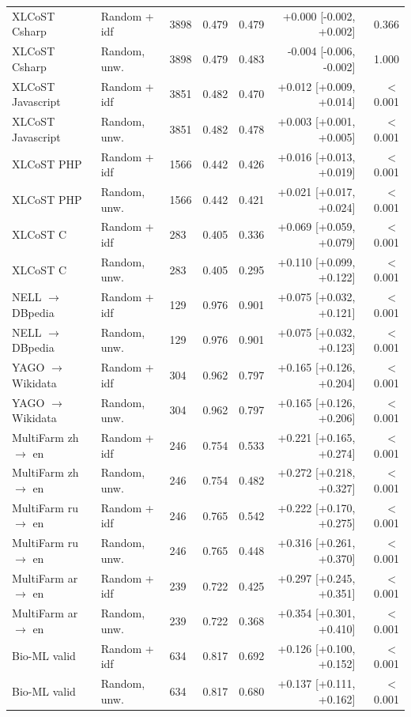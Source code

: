 \begin{longtable}{@{}lllrrrr@{}}
XLCoST Csharp & Random + idf & 3898 & 0.479 & 0.479 & +0.000 [-0.002, +0.002] & 0.366 \\
XLCoST Csharp & Random, unw. & 3898 & 0.479 & 0.483 & -0.004 [-0.006, -0.002] & 1.000 \\
XLCoST Javascript & Random + idf & 3851 & 0.482 & 0.470 & +0.012 [+0.009, +0.014] & $<$0.001 \\
XLCoST Javascript & Random, unw. & 3851 & 0.482 & 0.478 & +0.003 [+0.001, +0.005] & $<$0.001 \\
XLCoST PHP & Random + idf & 1566 & 0.442 & 0.426 & +0.016 [+0.013, +0.019] & $<$0.001 \\
XLCoST PHP & Random, unw. & 1566 & 0.442 & 0.421 & +0.021 [+0.017, +0.024] & $<$0.001 \\
XLCoST C & Random + idf & 283 & 0.405 & 0.336 & +0.069 [+0.059, +0.079] & $<$0.001 \\
XLCoST C & Random, unw. & 283 & 0.405 & 0.295 & +0.110 [+0.099, +0.122] & $<$0.001 \\
NELL $\to$ DBpedia & Random + idf & 129 & 0.976 & 0.901 & +0.075 [+0.032, +0.121] & $<$0.001 \\
NELL $\to$ DBpedia & Random, unw. & 129 & 0.976 & 0.901 & +0.075 [+0.032, +0.123] & $<$0.001 \\
YAGO $\to$ Wikidata & Random + idf & 304 & 0.962 & 0.797 & +0.165 [+0.126, +0.204] & $<$0.001 \\
YAGO $\to$ Wikidata & Random, unw. & 304 & 0.962 & 0.797 & +0.165 [+0.126, +0.206] & $<$0.001 \\
MultiFarm zh $\to$ en & Random + idf & 246 & 0.754 & 0.533 & +0.221 [+0.165, +0.274] & $<$0.001 \\
MultiFarm zh $\to$ en & Random, unw. & 246 & 0.754 & 0.482 & +0.272 [+0.218, +0.327] & $<$0.001 \\
MultiFarm ru $\to$ en & Random + idf & 246 & 0.765 & 0.542 & +0.222 [+0.170, +0.275] & $<$0.001 \\
MultiFarm ru $\to$ en & Random, unw. & 246 & 0.765 & 0.448 & +0.316 [+0.261, +0.370] & $<$0.001 \\
MultiFarm ar $\to$ en & Random + idf & 239 & 0.722 & 0.425 & +0.297 [+0.245, +0.351] & $<$0.001 \\
MultiFarm ar $\to$ en & Random, unw. & 239 & 0.722 & 0.368 & +0.354 [+0.301, +0.410] & $<$0.001 \\
Bio-ML valid & Random + idf & 634 & 0.817 & 0.692 & +0.126 [+0.100, +0.152] & $<$0.001 \\
Bio-ML valid & Random, unw. & 634 & 0.817 & 0.680 & +0.137 [+0.111, +0.162] & $<$0.001 \\

\end{longtable}
